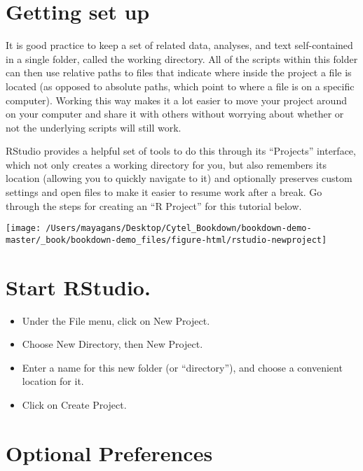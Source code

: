 \documentclass[]{book}
\providecommand{\tightlist}{%
  \setlength{\itemsep}{0pt}\setlength{\parskip}{0pt}}
\begin{document}
\hypertarget{getting-set-up}{%
\section{Getting set up}\label{getting-set-up}}

It is good practice to keep a set of related data, analyses, and text self-contained in a single folder, called the working directory. All of the scripts within this folder can then use relative paths to files that indicate where inside the project a file is located (as opposed to absolute paths, which point to where a file is on a specific computer). Working this way makes it a lot easier to move your project around on your computer and share it with others without worrying about whether or not the underlying scripts will still work.

RStudio provides a helpful set of tools to do this through its ``Projects'' interface, which not only creates a working directory for you, but also remembers its location (allowing you to quickly navigate to it) and optionally preserves custom settings and open files to make it easier to resume work after a break. Go through the steps for creating an ``R Project'' for this tutorial below.

\texttt{[image: /Users/mayagans/Desktop/Cytel\_Bookdown/bookdown-demo-master/\_book/bookdown-demo\_files/figure-html/rstudio-newproject]}

\hypertarget{start-rstudio.}{%
\section{Start RStudio.}\label{start-rstudio.}}

\begin{itemize}
\tightlist
\item
  Under the File menu, click on New Project.
\item
  Choose New Directory, then New Project.
\item
  Enter a name for this new folder (or ``directory''), and choose a convenient location for it.
\item
  Click on Create Project.
\end{itemize}

\hypertarget{optional-preferences}{%
\section{Optional Preferences}\label{optional-preferences}}
\end{document}
